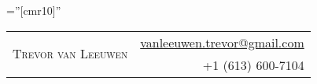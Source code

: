 \documentclass[letterpaper,10pt]{article}
\begin{document}
\pagestyle{empty} %

\font\fb=''[cmr10]'' %

\par{
    \begin{tabular}{lr}

        \multirow{2}{12.9cm}{\Huge{\textsc{Trevor van Leeuwen}}} & \href{mailto:vanleeuwen.trevor@gmail.com}{vanleeuwen.trevor@gmail.com} \\
         & +1 (613) 600-7104
    \end{tabular}
\medskip\par}


\end{document}
